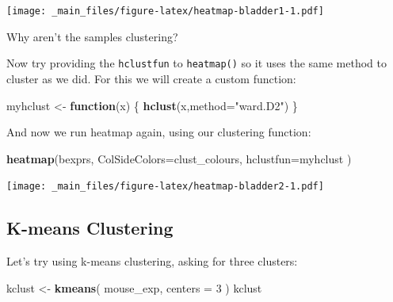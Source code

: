 \documentclass[
]{book}
\newenvironment{Shaded}{\begin{snugshade}}{\end{snugshade}}
\newcommand{\AttributeTok}[1]{\textcolor[rgb]{0.13,0.29,0.53}{#1}}
\newcommand{\ControlFlowTok}[1]{\textcolor[rgb]{0.13,0.29,0.53}{\textbf{#1}}}
\newcommand{\DecValTok}[1]{\textcolor[rgb]{0.00,0.00,0.81}{#1}}
\newcommand{\FunctionTok}[1]{\textcolor[rgb]{0.13,0.29,0.53}{\textbf{#1}}}
\newcommand{\NormalTok}[1]{#1}
\newcommand{\OtherTok}[1]{\textcolor[rgb]{0.56,0.35,0.01}{#1}}
\newcommand{\StringTok}[1]{\textcolor[rgb]{0.31,0.60,0.02}{#1}}
\begin{document}
\texttt{[image: \_main\_files/figure-latex/heatmap-bladder1-1.pdf]}

Why aren't the samples clustering?

Now try providing the \texttt{hclustfun} to \texttt{heatmap()} so it uses the same method to cluster as we did. For this we will create a custom function:

\begin{Shaded}
\begin{Highlighting}[]
\NormalTok{myhclust }\OtherTok{\textless{}{-}} \ControlFlowTok{function}\NormalTok{(x) \{}
    \FunctionTok{hclust}\NormalTok{(x,}\AttributeTok{method=}\StringTok{"ward.D2"}\NormalTok{)}
\NormalTok{\}}
\end{Highlighting}
\end{Shaded}

And now we run heatmap again, using our clustering function:

\begin{Shaded}
\begin{Highlighting}[]
\FunctionTok{heatmap}\NormalTok{(bexprs,}
    \AttributeTok{ColSideColors=}\NormalTok{clust\_colours,}
    \AttributeTok{hclustfun=}\NormalTok{myhclust}
\NormalTok{)}
\end{Highlighting}
\end{Shaded}

\texttt{[image: \_main\_files/figure-latex/heatmap-bladder2-1.pdf]}

\subsection{K-means Clustering}\label{k-means-clustering}

Let's try using k-means clustering, asking for three clusters:

\begin{Shaded}
\begin{Highlighting}[]
\NormalTok{kclust }\OtherTok{\textless{}{-}} \FunctionTok{kmeans}\NormalTok{(}
\NormalTok{    mouse\_exp, }
    \AttributeTok{centers =} \DecValTok{3}
\NormalTok{)}
\NormalTok{kclust}
\end{Highlighting}
\end{Shaded}
\end{document}
